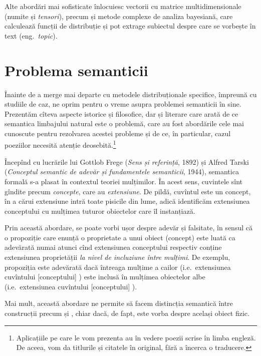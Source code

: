 Alte abordări mai sofisticate înlocuiesc vectorii cu matrice multidimensionale
(numite și \emph{tensori}), precum și metode complexe de analiza bayesiană,
care calculează funcții de distribuție și pot extrage subiectul despre care
se vorbește în text (eng.\ \emph{topic}).

\section{Problema semanticii}

Înainte de a merge mai departe cu metodele distribuționale specifice, împreună
cu studiile de caz, ne oprim pentru o vreme asupra problemei semanticii în sine.
Prezentăm cîteva aspecte istorice și filosofice, dar și literare care arată
de ce semantica limbajului natural este o problemă, care au fost abordările
cele mai cunoscute pentru rezolvarea acestei probleme și de ce, în particular,
cazul poeziilor necesită atenție deosebită.\footnote{Aplicațiile pe care le vom
  prezenta au în vedere poezii scrise în limba engleză. De aceea, vom da
  titlurile și citatele în original, fără a încerca o traducere.}

Începînd cu lucrările lui Gottlob Frege (\emph{Sens și referință}, 1892) și
Alfred Tarski (\emph{Conceptul semantic de adevăr și fundamentele semanticii}, 1944),
semantica formală s-a plasat în contextul teoriei mulțimilor. În acest sens,
cuvintele sînt gîndite precum \emph{concepte}, care au \emph{extensiune}.
De pildă, cuvîntul  este un concept, în a cărui extensiune
intră toate pisicile din lume, adică identificăm extensiunea conceptului
cu mulțimea tuturor obiectelor care îl instanțiază.

Prin această abordare, se poate vorbi ușor despre adevăr și falsitate, în sensul
că o propoziție care enunță o proprietate a unui obiect (concept) este luată
ca adevărată numai atunci cînd extensiunea conceptului respectiv conține
extensiunea proprietății \emph{la nivel de incluziune între mulțimi}.
De exemplu, propoziția  este adevărată dacă întreaga
mulțime a cailor (i.e.\ extensiunea cuvîntului [conceptului] ) este
inclusă în mulțimea obiectelor albe (i.e.\ extensiunea cuvîntului [conceptului]
).

Mai mult, această abordare ne permite să facem distincția semantică între
construcții precum  și , chiar dacă,
de fapt, este vorba despre același obiect fizic.

